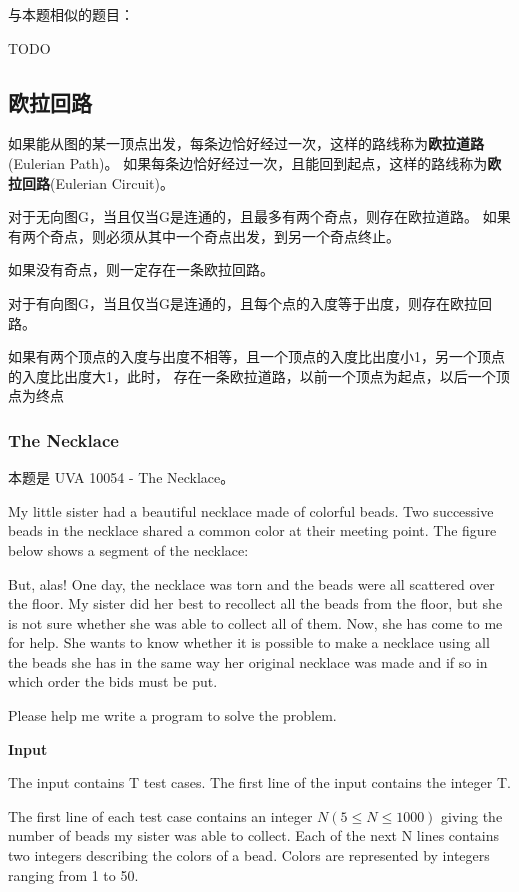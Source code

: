 与本题相似的题目：
\begindot
\item  TODO
\myenddot

\subsection{欧拉回路}
如果能从图的某一顶点出发，每条边恰好经过一次，这样的路线称为\textbf{欧拉道路}(Eulerian Path)。
如果每条边恰好经过一次，且能回到起点，这样的路线称为\textbf{欧拉回路}(Eulerian Circuit)。

对于无向图G，当且仅当G是连通的，且最多有两个奇点，则存在欧拉道路。
如果有两个奇点，则必须从其中一个奇点出发，到另一个奇点终止。

如果没有奇点，则一定存在一条欧拉回路。

对于有向图G，当且仅当G是连通的，且每个点的入度等于出度，则存在欧拉回路。

如果有两个顶点的入度与出度不相等，且一个顶点的入度比出度小1，另一个顶点的入度比出度大1，此时，
存在一条欧拉道路，以前一个顶点为起点，以后一个顶点为终点

\subsubsection{The Necklace} 
本题是 UVA 10054 - The Necklace。

My little sister had a beautiful necklace made of colorful beads. Two successive beads in the 
necklace shared a common color at their meeting point. The figure below shows a segment of 
the necklace:

\centerline{}

But, alas! One day, the necklace was torn and the beads were all scattered over the floor. 
My sister did her best to recollect all the beads from the floor, but she is not sure 
whether she was able to collect all of them. Now, she has come to me for help. She wants
 to know whether it is possible to make a necklace using all the beads she has in the same
 way her original necklace was made and if so in which order the bids must be put.

Please help me write a program to solve the problem.

\textbf{Input}

The input contains T test cases. The first line of the input contains the integer T.

The first line of each test case contains an integer $N(5 \leq N \leq 1000)$ giving the number of beads 
my sister was able to collect. Each of the next N lines contains two integers describing 
the colors of a bead. Colors are represented by integers ranging from 1 to 50.

